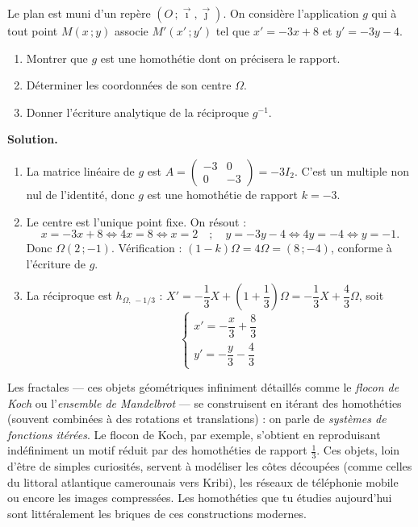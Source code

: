 \documentclass[11pt]{article}
\newcommand{\cle}[1]{{\popxbold\color{popdark}#1}}
\begin{document}
\begin{exoresolu}
Le plan est muni d'un repère $(O\,;\vec{\imath},\vec{\jmath})$. On considère l'application $g$ qui à tout point $M(x\,;y)$ associe $M'(x'\,;y')$ tel que $x' = -3x + 8$ et $y' = -3y - 4$.
\begin{enumerate}
\item Montrer que $g$ est une homothétie dont on précisera le rapport.
\item Déterminer les coordonnées de son centre $\Omega$.
\item Donner l'écriture analytique de la réciproque $g^{-1}$.
\end{enumerate}
\tcblower
\textbf{Solution.}
\begin{enumerate}
\item La matrice linéaire de $g$ est $A = \begin{pmatrix} -3 & 0 \\ 0 & -3 \end{pmatrix} = -3I_2$. C'est un multiple non nul de l'identité, donc $g$ est une homothétie de rapport $k = -3$.
\item Le centre est l'unique point fixe. On résout :
\[ x = -3x + 8 \iff 4x = 8 \iff x = 2 \quad ; \quad y = -3y - 4 \iff 4y = -4 \iff y = -1. \]
Donc $\Omega(2\,;-1)$. Vérification : $(1-k)\Omega = 4\Omega = (8\,;-4)$, conforme à l'écriture de $g$.
\item La réciproque est $h_{\Omega,\,-1/3}$ : $X' = -\dfrac{1}{3}X + \left(1 + \dfrac{1}{3}\right)\Omega = -\dfrac{1}{3}X + \dfrac{4}{3}\Omega$, soit
\[ \begin{cases} x' = -\dfrac{x}{3} + \dfrac{8}{3} \\[4pt] y' = -\dfrac{y}{3} - \dfrac{4}{3} \end{cases} \]
\end{enumerate}
\end{exoresolu}

\begin{savaistu}
Les \cle{fractales} — ces objets géométriques infiniment détaillés comme le \emph{flocon de Koch} ou l'\emph{ensemble de Mandelbrot} — se construisent en itérant des homothéties (souvent combinées à des rotations et translations) : on parle de \emph{systèmes de fonctions itérées}. Le flocon de Koch, par exemple, s'obtient en reproduisant indéfiniment un motif réduit par des homothéties de rapport $\tfrac{1}{3}$. Ces objets, loin d'être de simples curiosités, servent à modéliser les côtes découpées (comme celles du littoral atlantique camerounais vers Kribi), les réseaux de téléphonie mobile ou encore les images compressées. Les homothéties que tu étudies aujourd'hui sont littéralement les briques de ces constructions modernes.
\end{savaistu}
\end{document}
